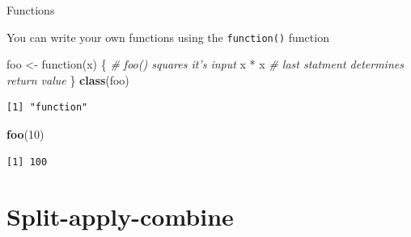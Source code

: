 \documentclass[10pt,ignorenonframetext,compress, aspectratio=169]{beamer}
\newenvironment{Shaded}{\begin{snugshade}}{\end{snugshade}}
\newcommand{\KeywordTok}[1]{\textcolor[rgb]{0.13,0.29,0.53}{\textbf{{#1}}}}
\newcommand{\DecValTok}[1]{\textcolor[rgb]{0.00,0.00,0.81}{{#1}}}
\newcommand{\StringTok}[1]{\textcolor[rgb]{0.31,0.60,0.02}{{#1}}}
\newcommand{\CommentTok}[1]{\textcolor[rgb]{0.56,0.35,0.01}{\textit{{#1}}}}
\newcommand{\NormalTok}[1]{{#1}}
\begin{document}
\begin{frame}[fragile]{Functions}

You can write your own functions using the \texttt{function()} function

\scriptsize

\begin{Shaded}
\begin{Highlighting}[]
\NormalTok{foo <-}\StringTok{ }\NormalTok{function(x) \{                    }\CommentTok{# foo() squares it's input}
    \NormalTok{x *}\StringTok{ }\NormalTok{x                               }\CommentTok{# last statment determines return value}
\NormalTok{\}}
\KeywordTok{class}\NormalTok{(foo)}
\end{Highlighting}
\end{Shaded}

\begin{verbatim}
[1] "function"
\end{verbatim}

\begin{Shaded}
\begin{Highlighting}[]
\KeywordTok{foo}\NormalTok{(}\DecValTok{10}\NormalTok{)}
\end{Highlighting}
\end{Shaded}

\begin{verbatim}
[1] 100
\end{verbatim}

\normalsize

\end{frame}

\section{Split-apply-combine}\label{split-apply-combine}
\end{document}
